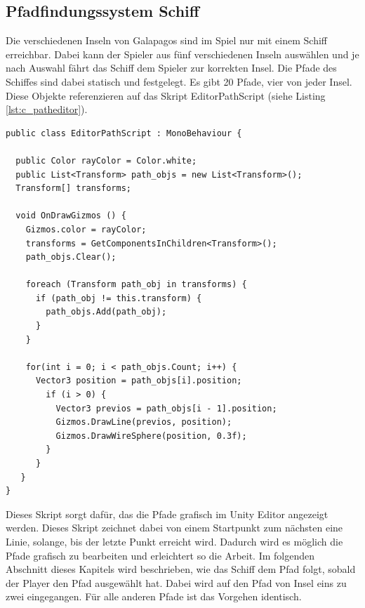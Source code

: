 		\subsection{Pfadfindungssystem Schiff}
			Die verschiedenen Inseln von Galapagos sind im Spiel nur mit einem Schiff erreichbar. Dabei kann der Spieler aus fünf verschiedenen Inseln auswählen und je nach Auswahl fährt das Schiff dem Spieler zur korrekten Insel. Die Pfade des Schiffes sind dabei statisch und festgelegt. Es gibt 20 Pfade, vier von jeder Insel. Diese Objekte referenzieren auf das Skript EditorPathScript (siehe Listing \ref{lst:c_patheditor}).

\begin{scriptsize}
\lstset{
	float,
	caption=Skript EditorPathScript.cs, 
	language=[Sharp]C, 
	frame=single,  
	showstringspaces=false, 
	showspaces=false, 
	numbers=left, 
	captionpos=b, 
	belowcaptionskip=4pt,
	basicstyle=\ttfamily
} 
\begin{lstlisting}[label=lst:c_patheditor]
public class EditorPathScript : MonoBehaviour {

  public Color rayColor = Color.white;
  public List<Transform> path_objs = new List<Transform>();
  Transform[] transforms;

  void OnDrawGizmos () {
    Gizmos.color = rayColor;
    transforms = GetComponentsInChildren<Transform>();
    path_objs.Clear();

    foreach (Transform path_obj in transforms) {
      if (path_obj != this.transform) {
        path_objs.Add(path_obj);
      }
    }

    for(int i = 0; i < path_objs.Count; i++) {
      Vector3 position = path_objs[i].position;
        if (i > 0) {
          Vector3 previos = path_objs[i - 1].position;
          Gizmos.DrawLine(previos, position);
          Gizmos.DrawWireSphere(position, 0.3f);
        }
      }
   }
}
\end{lstlisting}
\end{scriptsize}

			Dieses Skript sorgt dafür, das die Pfade grafisch im Unity Editor angezeigt werden. Dieses Skript zeichnet dabei von einem Startpunkt zum nächsten eine Linie, solange, bis der letzte Punkt erreicht wird. Dadurch wird es möglich die Pfade grafisch zu bearbeiten und erleichtert so die Arbeit. Im folgenden Abschnitt dieses Kapitels wird beschrieben, wie das Schiff dem Pfad folgt, sobald der Player den Pfad ausgewählt hat. Dabei wird auf den Pfad von Insel eins zu zwei eingegangen. Für alle anderen Pfade ist das Vorgehen identisch.


